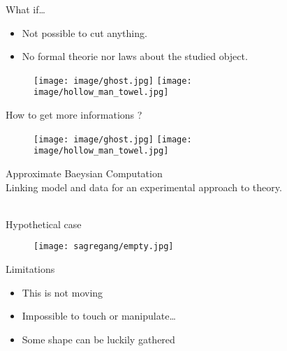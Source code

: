 \documentclass[10pt, notes=show]{beamer}
\begin{document}
\begin{frame}{What if\ldots}
    \begin{itemize}
        \item<+-> Not possible to cut anything.
        \item<+-> No formal theorie nor laws about the studied object.
    \end{itemize}
        \pause
    \begin{figure}[h]
        \centering
        \texttt{[image: image/ghost.jpg]}\hfill
        \pause
        \texttt{[image: image/hollow\_man\_towel.jpg]}
    \end{figure}
\end{frame}


\begin{frame}{}
    How to get more informations ?
    \begin{figure}
        \texttt{[image: image/ghost.jpg]}\hfill
        \texttt{[image: image/hollow\_man\_towel.jpg]}\\
         \hfill
    \end{figure}

\end{frame}

\begin{frame}{}
    \center
    Approximate Baeysian Computation\\Linking model and data for an experimental approach to theory.\\
    \vspace{1cm}
    \\
    \vspace{1cm}
\end{frame}




\begin{frame}{Hypothetical case}
    \begin{figure}
        \texttt{[image: sagregang/empty.jpg]}
    \end{figure}
\end{frame}

\begin{frame}{Limitations}
    \begin{itemize}
        \item<+-> This is not moving
        \item<+-> Impossible to touch or manipulate\ldots
        \item<+-> Some shape can be luckily gathered 
    \end{itemize}
    \vfil
    \begin{figure}
    \end{figure}
\end{frame}
\end{document}

